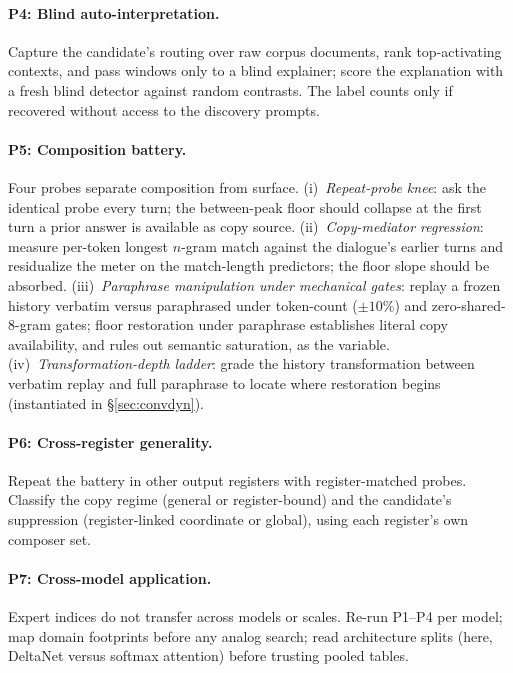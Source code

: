\documentclass[10pt,a4paper,twocolumn]{article}
\begin{document}
\paragraph{P4: Blind auto-interpretation.} Capture the candidate's routing
over raw corpus documents, rank top-activating contexts, and pass windows
only to a blind explainer; score the explanation with a fresh blind detector
against random contrasts. The label counts only if recovered without access
to the discovery prompts.

\paragraph{P5: Composition battery.} Four probes separate composition from
surface. (i)~\emph{Repeat-probe knee}: ask the identical probe every turn;
the between-peak floor should collapse at the first turn a prior answer is
available as copy source. (ii)~\emph{Copy-mediator regression}: measure
per-token longest $n$-gram match against the dialogue's earlier turns and
residualize the meter on the match-length predictors; the floor slope should
be absorbed. (iii)~\emph{Paraphrase manipulation under mechanical gates}:
replay a frozen history verbatim versus paraphrased under token-count
($\pm 10\%$) and zero-shared-8-gram gates; floor restoration under paraphrase
establishes literal copy availability, and rules out semantic saturation, as
the variable. (iv)~\emph{Transformation-depth ladder}: grade the history
transformation between verbatim replay and full paraphrase to locate where
restoration begins (instantiated in \S\ref{sec:convdyn}).

\paragraph{P6: Cross-register generality.} Repeat the battery in other output
registers with register-matched probes. Classify the copy regime (general or
register-bound) and the candidate's suppression (register-linked coordinate
or global), using each register's own composer set.

\paragraph{P7: Cross-model application.} Expert indices do not transfer
across models or scales. Re-run P1--P4 per model; map domain footprints
before any analog search; read architecture splits (here, DeltaNet versus
softmax attention) before trusting pooled tables.
\end{document}
